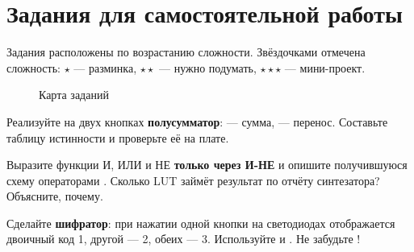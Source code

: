 \chapter{Задания для самостоятельной работы}

Задания расположены по возрастанию сложности. Звёздочками отмечена
сложность: \textcolor{FpgaOrange}{$\star$} --- разминка,
\textcolor{FpgaOrange}{$\star\star$} --- нужно подумать,
\textcolor{FpgaOrange}{$\star\star\star$} --- мини-проект.

\begin{figure}[H]
\centering
{}
\caption{Карта заданий}
\end{figure}

\begin{taskbox}
Реализуйте на двух кнопках \textbf{полусумматор}:  --- сумма,
 --- перенос. Составьте таблицу истинности и проверьте её на плате.
\end{taskbox}

\begin{taskbox}
Выразите функции И, ИЛИ и НЕ \textbf{только через И-НЕ} и опишите получившуюся
схему операторами . Сколько LUT займёт
результат по отчёту синтезатора? Объясните, почему.
\end{taskbox}

\begin{taskbox}
Сделайте \textbf{шифратор}: при нажатии одной кнопки на светодиодах
отображается двоичный код 1, другой --- 2, обеих --- 3. Используйте
 и . Не забудьте !
\end{taskbox}

